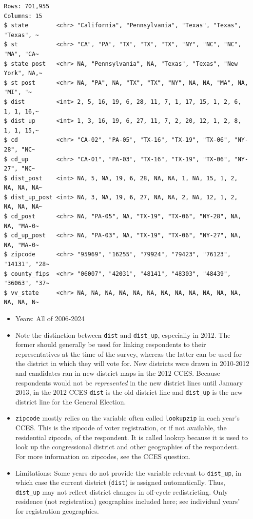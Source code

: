 \documentclass[10pt,article,oneside]{memoir}
\begin{document}
\begin{verbatim}
Rows: 701,955
Columns: 15
$ state        <chr> "California", "Pennsylvania", "Texas", "Texas", "Texas", ~
$ st           <chr> "CA", "PA", "TX", "TX", "TX", "NY", "NC", "NC", "MA", "CA~
$ state_post   <chr> NA, "Pennsylvania", NA, "Texas", "Texas", "New York", NA,~
$ st_post      <chr> NA, "PA", NA, "TX", "TX", "NY", NA, NA, "MA", NA, "MI", "~
$ dist         <int> 2, 5, 16, 19, 6, 28, 11, 7, 1, 17, 15, 1, 2, 6, 1, 1, 16,~
$ dist_up      <int> 1, 3, 16, 19, 6, 27, 11, 7, 2, 20, 12, 1, 2, 8, 1, 1, 15,~
$ cd           <chr> "CA-02", "PA-05", "TX-16", "TX-19", "TX-06", "NY-28", "NC~
$ cd_up        <chr> "CA-01", "PA-03", "TX-16", "TX-19", "TX-06", "NY-27", "NC~
$ dist_post    <int> NA, 5, NA, 19, 6, 28, NA, NA, 1, NA, 15, 1, 2, NA, NA, NA~
$ dist_up_post <int> NA, 3, NA, 19, 6, 27, NA, NA, 2, NA, 12, 1, 2, NA, NA, NA~
$ cd_post      <chr> NA, "PA-05", NA, "TX-19", "TX-06", "NY-28", NA, NA, "MA-0~
$ cd_up_post   <chr> NA, "PA-03", NA, "TX-19", "TX-06", "NY-27", NA, NA, "MA-0~
$ zipcode      <chr> "95969", "16255", "79924", "79423", "76123", "14131", "28~
$ county_fips  <chr> "06007", "42031", "48141", "48303", "48439", "36063", "37~
$ vv_state     <chr> NA, NA, NA, NA, NA, NA, NA, NA, NA, NA, NA, NA, NA, NA, N~
\end{verbatim}

\begin{itemize}
\tightlist
\item
  Years: All of 2006-2024
\item
  Note the distinction between \texttt{dist} and \texttt{dist\_up},
  especially in 2012. The former should generally be used for linking
  respondents to their representatives at the time of the survey,
  whereas the latter can be used for the district in which they will
  vote for. New districts were drawn in 2010-2012 and candidates ran in
  new district maps in the 2012 CCES. Because respondents would not be
  \emph{represented} in the new district lines until January 2013, in
  the 2012 CCES \texttt{dist} is the old district line and
  \texttt{dist\_up} is the new district line for the General Election.
\item
  \texttt{zipcode} mostly relies on the variable often called
  \texttt{lookupzip} in each year's CCES. This is the zipcode of voter
  registration, or if not available, the residential zipcode, of the
  respondent. It is called lookup because it is used to look up the
  congressional district and other geographies of the respondent. For
  more information on zipcodes, see the CCES question.
\item
  Limitations: Some years do not provide the variable relevant to
  \texttt{dist\_up}, in which case the current district (\texttt{dist})
  is assigned automatically. Thus, \texttt{dist\_up} may not reflect
  district changes in off-cycle redistricting. Only residence (not
  registration) geographies included here; see individual years' for
  registration geographies.
\end{itemize}
\end{document}
